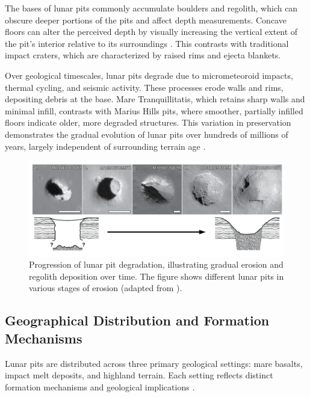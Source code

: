 The bases of lunar pits commonly accumulate boulders and regolith, which can obscure deeper portions of the pits and affect depth measurements. Concave floors can alter the perceived depth by visually increasing the vertical extent of the pit's interior relative to its surroundings \cite{lunar-pit-distribution, new-wagner}. This contrasts with traditional impact craters, which are characterized by raised rims and ejecta blankets.

Over geological timescales, lunar pits degrade due to micrometeoroid impacts, thermal cycling, and seismic activity. These processes erode walls and rims, depositing debris at the base. Mare Tranquillitatis, which retains sharp walls and minimal infill, contrasts with Marius Hills pits, where smoother, partially infilled floors indicate older, more degraded structures. This variation in preservation demonstrates the gradual evolution of lunar pits over hundreds of millions of years, largely independent of surrounding terrain age \cite{lunar-pit-distribution, radar-observations-lava-tubes, newer-thermal}.

\begin{figure}[H]
    \centering
    \includegraphics[width=0.85\linewidth]{closed_and_open_cavities.png}
    \caption{Progression of lunar pit degradation, illustrating gradual erosion and regolith deposition over time. The figure shows different lunar pits in various stages of erosion (adapted from \cite{new-wagner}).}
    \label{fig:lunar-pit-degradation}
\end{figure}

\subsection{Geographical Distribution and Formation Mechanisms}

Lunar pits are distributed across three primary geological settings: mare basalts, impact melt deposits, and highland terrain. Each setting reflects distinct formation mechanisms and geological implications \cite{lunar-pit-distribution, radar-observations-lava-tubes}.


